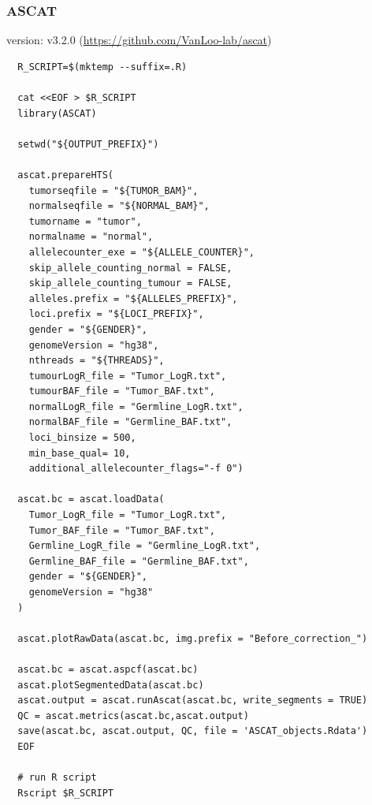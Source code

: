 \documentclass[pdflatex,sn-nature]{sn-jnl}
\begin{document}
\subsubsection{ASCAT}
version: v3.2.0 (\url{https://github.com/VanLoo-lab/ascat})
\label{supp:ascat}
\begin{verbatim}
  R_SCRIPT=$(mktemp --suffix=.R)

  cat <<EOF > $R_SCRIPT
  library(ASCAT)

  setwd("${OUTPUT_PREFIX}")

  ascat.prepareHTS(
    tumorseqfile = "${TUMOR_BAM}",
    normalseqfile = "${NORMAL_BAM}",
    tumorname = "tumor",
    normalname = "normal",
    allelecounter_exe = "${ALLELE_COUNTER}",
    skip_allele_counting_normal = FALSE,
    skip_allele_counting_tumour = FALSE,
    alleles.prefix = "${ALLELES_PREFIX}",
    loci.prefix = "${LOCI_PREFIX}",
    gender = "${GENDER}",
    genomeVersion = "hg38",
    nthreads = "${THREADS}",
    tumourLogR_file = "Tumor_LogR.txt",
    tumourBAF_file = "Tumor_BAF.txt",
    normalLogR_file = "Germline_LogR.txt",
    normalBAF_file = "Germline_BAF.txt",
    loci_binsize = 500,
    min_base_qual= 10,
    additional_allelecounter_flags="-f 0")

  ascat.bc = ascat.loadData(
    Tumor_LogR_file = "Tumor_LogR.txt",
    Tumor_BAF_file = "Tumor_BAF.txt",
    Germline_LogR_file = "Germline_LogR.txt",
    Germline_BAF_file = "Germline_BAF.txt",
    gender = "${GENDER}",
    genomeVersion = "hg38"
  )

  ascat.plotRawData(ascat.bc, img.prefix = "Before_correction_")

  ascat.bc = ascat.aspcf(ascat.bc)
  ascat.plotSegmentedData(ascat.bc)
  ascat.output = ascat.runAscat(ascat.bc, write_segments = TRUE)
  QC = ascat.metrics(ascat.bc,ascat.output)
  save(ascat.bc, ascat.output, QC, file = 'ASCAT_objects.Rdata')
  EOF

  # run R script
  Rscript $R_SCRIPT
\end{verbatim}
\end{document}

